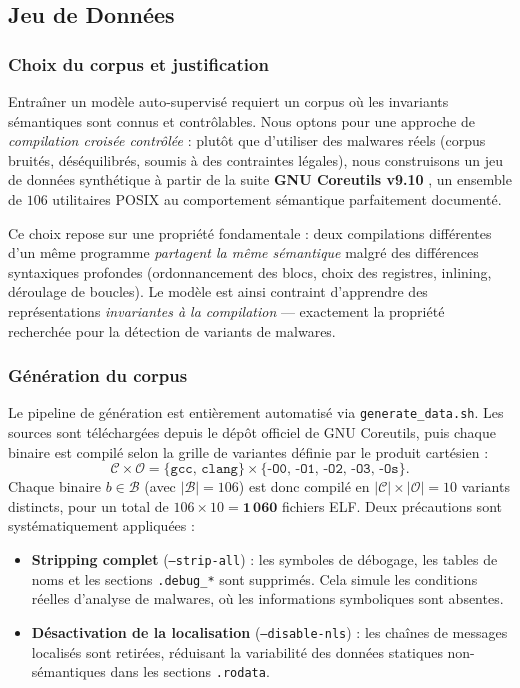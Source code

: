 \subsection{Jeu de Données}
\label{sec:dataset}

\subsubsection{Choix du corpus et justification}

Entraîner un modèle auto-supervisé requiert un corpus où les
invariants sémantiques sont connus et contrôlables. Nous optons pour
une approche de \emph{compilation croisée contrôlée} : plutôt que
d'utiliser des malwares réels (corpus bruités, déséquilibrés, soumis
à des contraintes légales), nous construisons un jeu de données
synthétique à partir de la suite \textbf{GNU Coreutils
v9.10} \cite{coreutils9_10}, un ensemble de $106$ utilitaires POSIX au
comportement sémantique parfaitement documenté.

Ce choix repose sur une propriété fondamentale : deux compilations
différentes d'un même programme \emph{partagent la même sémantique}
malgré des différences syntaxiques profondes (ordonnancement des
blocs, choix des registres, inlining, déroulage de boucles). Le
modèle est ainsi contraint d'apprendre des représentations
\emph{invariantes à la compilation} — exactement la propriété
recherchée pour la détection de variants de malwares.

\subsubsection{Génération du corpus}

Le pipeline de génération est entièrement automatisé via
\texttt{generate\_data.sh}. Les sources sont téléchargées depuis le
dépôt officiel de GNU Coreutils, puis chaque binaire est compilé
selon la grille de variantes définie par le produit cartésien :
\[
  \mathcal{C} \times \mathcal{O}
  = \{\texttt{gcc},\,\texttt{clang}\}
    \times \{\texttt{-O0},\,\texttt{-O1},\,\texttt{-O2},\,\texttt{-O3},\,\texttt{-Os}\}.
\]
Chaque binaire $b \in \mathcal{B}$ (avec $|\mathcal{B}| = 106$) est
donc compilé en $|\mathcal{C}| \times |\mathcal{O}| = 10$ variants
distincts, pour un total de $106 \times 10 = \mathbf{1\,060}$ fichiers
ELF. Deux précautions sont systématiquement appliquées :

\begin{itemize}
  \item \textbf{Stripping complet} (\texttt{--strip-all}) : les
    symboles de débogage, les tables de noms et les sections
    \texttt{.debug\_*} sont supprimés. Cela simule les conditions
    réelles d'analyse de malwares, où les informations symboliques
    sont absentes.
  \item \textbf{Désactivation de la localisation} (\texttt{--disable-nls}) :
    les chaînes de messages localisés sont retirées, réduisant la
    variabilité des données statiques non-sémantiques dans les
    sections \texttt{.rodata}.
\end{itemize}

